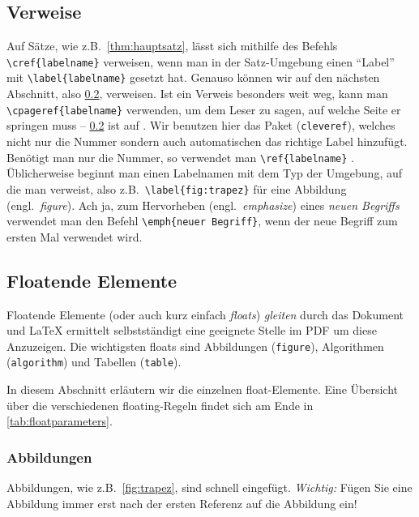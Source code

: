 \documentclass[bachelor,german]{algothesis}
\begin{document}
\subsection{Verweise}
Auf Sätze, wie z.B.\ \cref{thm:hauptsatz}, lässt sich mithilfe des Befehls \verb+\cref{labelname}+ verweisen, wenn man in der Satz-Umgebung einen "`Label"' mit \verb+\label{labelname}+ gesetzt hat.  
Genauso können wir auf den nächsten Abschnitt, also \cref{sec:leichtigkeit}, verweisen. Ist ein Verweis besonders weit weg, kann man \verb+\cpageref{labelname}+ verwenden, 
um dem Leser zu sagen, auf welche Seite er springen muss -- \cref{sec:leichtigkeit} ist auf .
Wir benutzen hier das Paket (\verb+cleveref+), welches nicht nur die Nummer sondern auch automatischen das richtige Label hinzufügt. Benötigt man nur die Nummer, so verwendet man \verb+\ref{labelname}+ .
Üblicherweise beginnt man einen Labelnamen mit dem Typ der Umgebung, auf die man verweist, also z.B.\ \verb+\label{fig:trapez}+ für eine Abbildung (engl.\ \emph{figure}).  
Ach ja, zum Hervorheben (engl.\ \emph{emphasize}) eines \emph{neuen Begriffs} verwendet man den Befehl \verb+\emph{neuer Begriff}+, wenn der neue Begriff zum ersten Mal verwendet wird.


\subsection{Floatende Elemente}
\label{sec:leichtigkeit}
Floatende Elemente (oder auch kurz einfach \emph{floats}) \emph{gleiten} durch das Dokument und \LaTeX{} ermittelt selbstständigt eine geeignete Stelle im PDF um diese Anzuzeigen.
Die wichtigsten floats sind Abbildungen (\verb+figure+), Algorithmen (\verb+algorithm+) und Tabellen (\verb+table+).

In diesem Abschnitt erläutern wir die einzelnen float-Elemente.
Eine Übersicht über die verschiedenen floating-Regeln findet sich am Ende in \cref{tab:floatparameters}.

\subsubsection{Abbildungen}
Abbildungen, wie z.B.\ \cref{fig:trapez}, sind schnell eingefügt.  
\emph{Wichtig:} Fügen Sie eine Abbildung immer erst nach der ersten Referenz auf die Abbildung ein!
\end{document}
